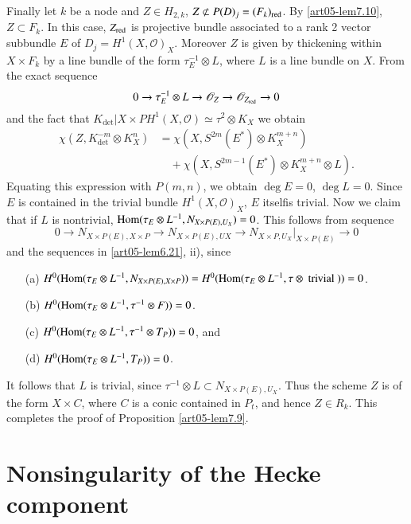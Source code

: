 Finally let $k$ be a node and $Z\in H_{2,k}$, $Z\nsubset
P(D)_{j}=(F_{k})_{\red}$. By \ref{art05-lem7.10}, $Z\subset F_{k}$. In
this case, $Z_{\operatorname{red}}$ is projective bundle associated to a rank 2
vector subbundle $E$ of $D_{j}=H^{1}(X,\mathscr{O})_{X}$. Moreover $Z$
is given by thickening within $X\times F_{k}$ by a line bundle of the
form $\tau^{-1}_{E}\otimes L$, where $L$ is a line bundle on $X$. From
the exact sequence
$$
0\to \tau^{-1}_{E}\otimes
L\to \mathscr{O}_{Z}\to \mathscr{O}_{Z_{\operatorname{red}}}\to 0
$$
and the fact that $K_{\det}|X\times
PH^{1}(X,\mathscr{O})\simeq \tau^{2}\otimes K_{X}$ we obtain
\begin{align*}
\chi(Z,K^{-m}_{\det}\otimes K^{n}_{X}) & =\chi(X,S^{2m}(E^{*})\otimes
K^{m+n}_{X})\\
&\quad +\chi(X,S^{2m-1}(E^{*})\otimes K^{m+n}_{X}\otimes L).
\end{align*}
Equating this expression with $P(m,n)$, we obtain 
$\deg E=0$, $\deg L=0$. 
Since $E$ is contained in the trivial bundle
$H^{1}(X,\mathscr{O})_{X}$, $E$ itself\pageoriginale is trivial. Now
we claim that if $L$ is nontrivial, $\operatorname{Hom}(\tau_{E}\otimes
L^{-1},N_{X\times P(E),U_{X}})=0$. This follows from sequence 
$$
0\to
N_{X\times P(E),X\times P}\to N_{X\times P(E),UX}\to N_{X\times
P,U_{X}}|_{X\times P(E)}\to 0
$$ 
and the sequences
in \ref{art05-lem6.21}, ii), since
\begin{itemize}
\item[(a)] $H^{0}(\operatorname{Hom}(\tau_{E}\otimes L^{-1},N_{X\times P(E),X\times
P}))=H^{0}(\operatorname{Hom}(\tau_{E}\otimes L^{-1},\tau\otimes \text{~trivial~}))=0$.

\item[(b)] $H^{0}(\operatorname{Hom}(\tau_{E}\otimes L^{-1},\tau^{-1}\otimes F))=0$.

\item[(c)] $H^{0}(\operatorname{Hom}(\tau_{E}\otimes L^{-1},\tau^{-1}\otimes
T_{P}))=0$, and

\item[(d)] $H^{0}(\operatorname{Hom}(\tau_{E}\otimes L^{-1},T_{P}))=0$.
\end{itemize}

It follows that $L$ is trivial, since $\tau^{-1}\otimes L\subset
N_{X\times P(E),U_{X}}$. Thus the scheme $Z$ is of the form $X\times
C$, where $C$ is a conic contained in $P_{t}$, and hence $Z\in
R_{k}$. This completes the proof of Proposition \ref{art05-lem7.9}.

\section{Nonsingularity of the Hecke component}\label{art05-sec8}

